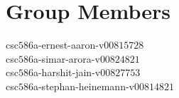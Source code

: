 \documentclass[paper=letter, fontsize=11pt]{scrartcl}
\numberwithin{equation}{section}
\numberwithin{figure}{section}
\numberwithin{table}{section}
\begin{document}
\section{Group Members}
\label{sec:group_members}
csc$586$a-ernest-aaron-v$00815728$\\
csc$586$a-simar-arora-v$00824821$\\
csc$586$a-harshit-jain-v$00827753$\\
csc$586$a-stephan-heinemann-v$00814821$

\clearpage
\label{appendix}


\clearpage
\label{bibliography}


\end{document}

